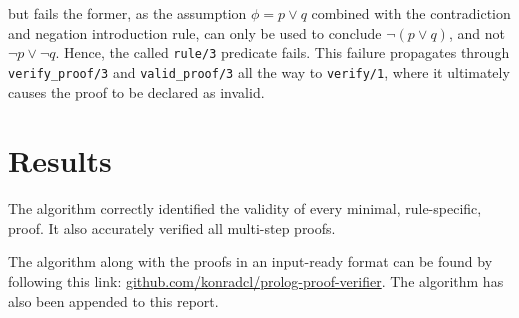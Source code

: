 \documentclass[a4paper, 11pt]{article}
\begin{document}
   but fails the former, as the assumption $\phi = p \vee q$
   combined with the contradiction and negation introduction 
   rule, can only be used to conclude $\neg (p \vee q)$, and
   not $\neg p \vee \neg q$. Hence, the called
   \texttt{rule/3} predicate fails. This failure propagates
   through \texttt{verify\_proof/3} and 
   \texttt{valid\_proof/3} all the way to \texttt{verify/1},
   where it ultimately causes the proof to be declared as
   invalid.

   \section{Results}
   The algorithm correctly identified the validity of every
   minimal, rule-specific, proof. It also accurately verified
   all multi-step proofs.
   \bigbreak

   The algorithm along with the proofs in an input-ready
   format can be found by following this link: 
   \url{github.com/konradcl/prolog-proof-verifier}. The
   algorithm has also been appended to this report.
\end{document}
